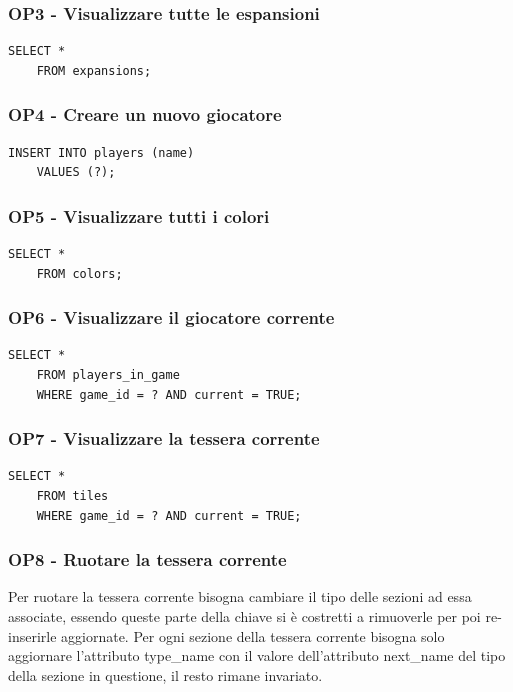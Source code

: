\subsubsection*{OP3 - Visualizzare tutte le espansioni}
\begin{lstlisting}[style=sql]
    SELECT *
    FROM expansions;
\end{lstlisting}

\subsubsection*{OP4 - Creare un nuovo giocatore}
\begin{lstlisting}[style=sql]
    INSERT INTO players (name)
    VALUES (?);
\end{lstlisting}

\subsubsection*{OP5 - Visualizzare tutti i colori}
\begin{lstlisting}[style=sql]
    SELECT *
    FROM colors;
\end{lstlisting}

\subsubsection*{OP6 - Visualizzare il giocatore corrente}
\begin{lstlisting}[style=sql]
    SELECT *
    FROM players_in_game
    WHERE game_id = ? AND current = TRUE;
\end{lstlisting}

\subsubsection*{OP7 - Visualizzare la tessera corrente}
\begin{lstlisting}[style=sql]
    SELECT *
    FROM tiles
    WHERE game_id = ? AND current = TRUE;
\end{lstlisting}

\subsubsection*{OP8 - Ruotare la tessera corrente}
Per ruotare la tessera corrente bisogna cambiare il tipo delle sezioni ad essa associate, essendo queste parte della chiave si è costretti a rimuoverle per poi re-inserirle aggiornate. Per ogni sezione della tessera corrente bisogna solo aggiornare l'attributo type\_name con il valore dell'attributo next\_name del tipo della sezione in questione, il resto rimane invariato.
\medskip

